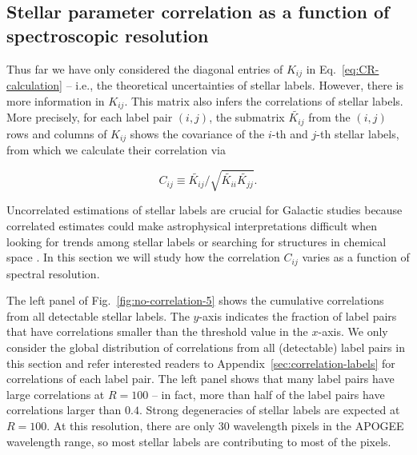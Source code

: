 \documentclass[iop]{emulateapj}
\begin{document}
\begin{CJK*}{UTF8}{gbsn}
\subsection{Stellar parameter correlation as a function of spectroscopic resolution}
\label{sec:correlation-loss}

Thus far we have only considered the diagonal entries of $K_{ij}$ in Eq.~\ref{eq:CR-calculation} -- i.e., the theoretical uncertainties of stellar labels. However, there is more information in $K_{ij}$. This matrix also infers the correlations of stellar labels. More precisely, for each label pair $(i,j)$, the submatrix $\widetilde{K_{ij}}$ from the $(i,j)$ rows and columns of $K_{ij}$ shows the covariance of the $i$-th and $j$-th stellar labels, from which we calculate their correlation via 

\begin{equation}
C_{ij} \equiv \widetilde{K_{ij}}/\sqrt{\widetilde{K_{ii}}\widetilde{K_{jj}}}.
\end{equation}

\noindent
Uncorrelated estimations of stellar labels are crucial for Galactic studies because correlated estimates could make astrophysical interpretations difficult when looking for trends among stellar labels or searching for structures in chemical space \citep{tin15b}. In this section we will study how the correlation $C_{ij}$ varies as a function of spectral resolution.

The left panel of Fig.~\ref{fig:no-correlation-5} shows the cumulative correlations from all detectable stellar labels. The $y$-axis indicates the fraction of label pairs that have correlations smaller than the threshold value in the $x$-axis. We only consider the global distribution of correlations from all (detectable) label pairs in this section and refer interested readers to Appendix~\ref{sec:correlation-labels} for correlations of each label pair. The left panel shows that many label pairs have large correlations at $R = 100$ -- in fact, more than half of the label pairs have correlations larger than $0.4$. Strong degeneracies of stellar labels are expected at $R = 100$. At this resolution, there are only $30$ wavelength pixels in the APOGEE wavelength range, so most stellar labels are contributing to most of the pixels.  


\end{CJK*}
\end{document}
